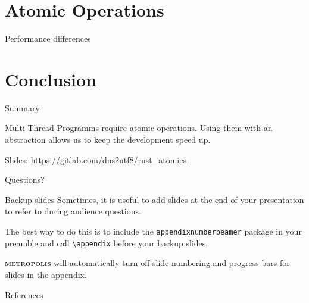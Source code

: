 \documentclass[10pt]{beamer}
\newcommand{\themename}{\textbf{\textsc{metropolis}}\xspace}
\begin{document}
\section{Atomic Operations}

\begin{frame}{Performance differences}
    \cite{AMD64ArchVol1}
\end{frame}

\section{Conclusion}

\begin{frame}{Summary}

  Multi-Thread-Programms require atomic operations.
  Using them with an abstraction allows us to keep the development speed up.

  \begin{center}Slides: \url{https://gitlab.com/dns2utf8/rust_atomics}\end{center}


\end{frame}

{
\begin{frame}[standout]
  Questions?
\end{frame}
}

\appendix

\begin{frame}[fragile]{Backup slides}
  Sometimes, it is useful to add slides at the end of your presentation to
  refer to during audience questions.

  The best way to do this is to include the \verb|appendixnumberbeamer|
  package in your preamble and call \verb|\appendix| before your backup slides.

  \themename will automatically turn off slide numbering and progress bars for
  slides in the appendix.
\end{frame}

\begin{frame}[allowframebreaks]{References}

  
  

\end{frame}
\end{document}
